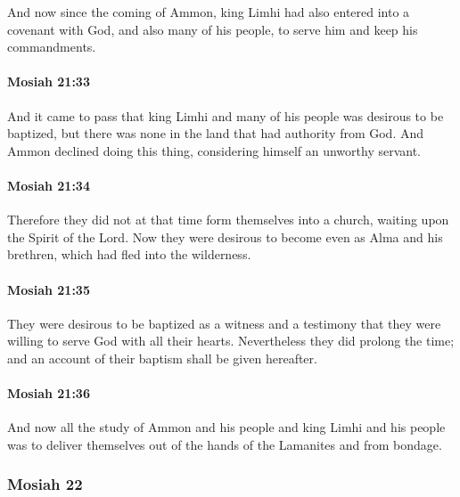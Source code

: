 			And now since the coming of Ammon,
			king Limhi had also entered into a covenant with God,
			and also many of his people,
			to serve him and keep his commandments.

		\paragraph{Mosiah 21:33} %
			\label{MOSIAH-21-33}

			And it came to pass that
			king Limhi and many of his people was desirous to be baptized,
			but there was none in the land that had authority from God.
			And Ammon declined doing this thing,
			considering himself an unworthy servant.

		\paragraph{Mosiah 21:34} %
			\label{MOSIAH-21-34}

			Therefore they did not at that time form themselves into a church,
			waiting upon the Spirit of the Lord.
			Now they were desirous to become even as Alma and his brethren,
			which had fled into the wilderness.

		\paragraph{Mosiah 21:35} %
			\label{MOSIAH-21-35}

			They were desirous to be baptized as a witness and a testimony
			that they were willing to serve God with all their hearts.
			Nevertheless they did prolong the time;
			and an account of their baptism shall be given hereafter.

		\paragraph{Mosiah 21:36} %
			\label{MOSIAH-21-36}

			And now all the study of Ammon and his people and king Limhi and his people
			was to deliver themselves out of the hands of the Lamanites and from bondage.

	\subsubsection{Mosiah 22} %
		\label{MOSIAH-22}
		
